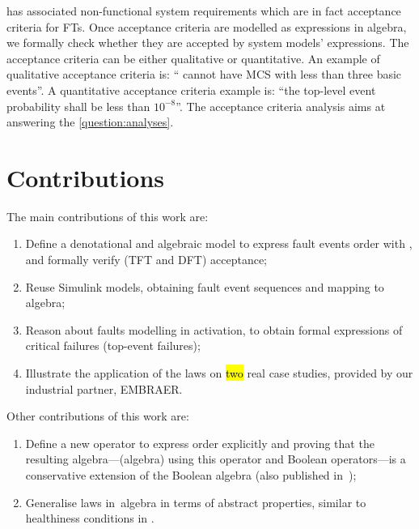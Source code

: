 \documentclass[12pt,openright,twoside,a4paper,oldfontcommands,english,brazil,draft]{abntex2}
\theoremstyle{theo}
\newcommand{\EMBRAER}{EMBRAER\xspace}
\newcommand{\simulink}{Simulink\xspace}
\begin{document}
 has associated non-functional system requirements which are in fact acceptance criteria for \acp{FT}.
Once acceptance criteria are modelled as expressions in \ac{algebra}, we formally check whether they are accepted by system models' expressions.
The acceptance criteria can be either qualitative or quantitative.
An example of qualitative acceptance criteria is: `` cannot have \ac{MCS} with less than three basic events''.
A quantitative acceptance criteria example is: ``the top-level event probability shall be less than $10^{-8}$''.
The acceptance criteria analysis aims at answering the \ref{question:analyses}.

\section{Contributions}

The main contributions of this work are:

\begin{enumerate}
  \item Define a denotational and algebraic model to express fault events order with , and formally verify  (\ac{TFT} and \ac{DFT}) acceptance;
  \item Reuse \simulink models, obtaining fault event sequences and mapping to \ac{algebra};
  \item Reason about faults modelling in \ac{activation}, to obtain formal expressions of critical failures (top-event failures);
  \item Illustrate the application of the laws on \hl{two} real case studies, provided by our industrial partner, \EMBRAER.
\end{enumerate}

Other contributions of this work are:

\begin{enumerate}
  \item Define a new operator to express order explicitly and proving that the resulting algebra---(\ac{algebra}) using this operator and Boolean operators---is a conservative extension of the Boolean algebra (also published in~\cite{DM2016});
  \item Generalise laws in~\ac{algebra} in terms of abstract properties, similar to healthiness conditions in .
\end{enumerate}
\end{document}

